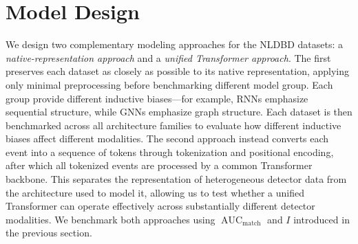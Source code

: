 \begingroup
\renewcommand{\arraystretch}{1}

\section{Model Design}
\label{sec:model-design}

We design two complementary modeling approaches for the NLDBD datasets: a \emph{native-representation approach} and a \emph{unified Transformer approach}. The first preserves each dataset as closely as possible to its native representation, applying only minimal preprocessing before benchmarking different model group. Each group provide different inductive biases---for example, RNNs emphasize sequential structure, while GNNs emphasize graph structure. Each dataset is then benchmarked across all architecture families to evaluate how different inductive biases affect different modalities. The second approach instead converts each event into a sequence of tokens through tokenization and positional encoding, after which all tokenized events are processed by a common Transformer backbone. This separates the representation of heterogeneous detector data from the architecture used to model it, allowing us to test whether a unified Transformer can operate effectively across substantially different detector modalities. We benchmark both approaches using $\operatorname{AUC}_{\mathrm{match}}$ and $I$ introduced in the previous section.



\FloatBarrier



\FloatBarrier

\endgroup
